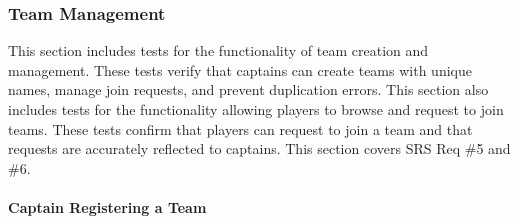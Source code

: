 \documentclass[12pt, titlepage]{article}
\begin{document}
\subsubsection{Team Management}

This section includes tests for the functionality of team creation and management. These tests verify that captains can create teams with unique names, manage join requests, and prevent duplication errors. This section also includes tests for the functionality allowing players to browse and request to join teams. These tests confirm that players can request to join a team and that requests are accurately reflected to captains. This section covers SRS Req \#5 and \#6.

\paragraph{Captain Registering a Team}
\end{document}
